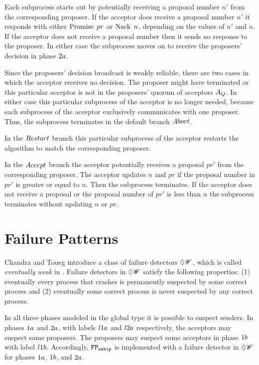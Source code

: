 Each subprocess starts out by potentially receiving a proposal number $n'$ from the corresponding proposer.
If the acceptor does receive a proposal number $n'$ it responds with either $\operatorname{Promise}\; pr$ or $\operatorname{Nack}\; n$, depending on the values of $n'$ and $n$.
If the acceptor does not receive a proposal number then it sends no response to the proposer.
In either case the subprocess moves on to receive the proposers' decision in phase $2a$.

Since the proposers' decision broadcast is weakly reliable, there are two cases in which the acceptor receives no decision.
The proposer might have terminated or this particular acceptor is not in the proposers' quorum of acceptors $A_Q$.
In either case this particular subprocess of the acceptor is no longer needed, because each subprocess of the acceptor exclusively communicates with one proposer.
Thus, the subprocess terminates in the default branch $\mathnormal{Abort}$.

In the $\mathnormal{Restart}$ branch this particular subprocess of the acceptor restarts the algorithm to match the corresponding proposer.

In the $\mathnormal{Accept}$ branch the acceptor potentially receives a proposal $pr'$ from the corresponding proposer.
The acceptor updates $n$ and $pr$ if the proposal number in $pr'$ is greater or equal to $n$.
Then the subprocess terminates.
If the acceptor does not receive a proposal or the proposal number of $pr'$ is less than $n$ the subprocess terminates without updating $n$ or $pr$.

\section{Failure Patterns}
Chandra and Toueg introduce a class of failure detectors $\Diamond\mathscr{W}$, which is called \emph{eventually weak} in \cite{failure_detectors}.
Failure detectors in $\Diamond\mathscr{W}$ satisfy the following properties: (1) eventually every process that crashes is permanently suspected by some correct process and (2) eventually some correct process is never suspected by any correct process.

In all three phases modeled in the global type it is possible to suspect senders.
In phases $1a$ and $2a$, with labels $l1a$ and $l2a$ respectively, the acceptors may suspect some proposers.
The proposers may suspect some acceptors in phase $1b$ with label $l1b$.
Accordingly, $\mathtt{FP_{uskip}}$ is implemented with a failure detector in $\Diamond\mathscr{W}$ for phases $1a$, $1b$, and $2a$.

